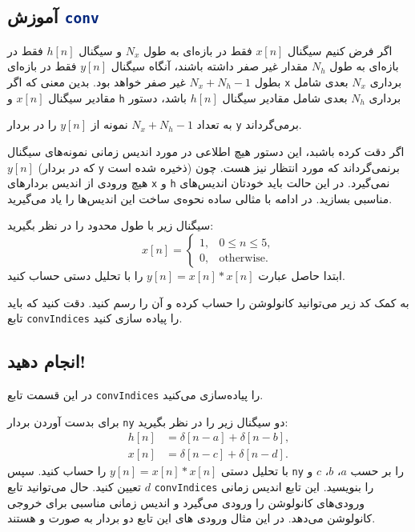 \documentclass{utsignal}
\begin{document}
	\subsection{آموزش \lstinline[language=Octave]{conv}}
	اگر فرض کنیم سیگنال $x[n]$ فقط در بازه‌ای به طول $N_x$ و سیگنال $h[n]$ فقط در بازه‌ای به طول $N_h$ مقدار غیر صفر داشته باشند، آنگاه سیگنال $y[n]$ فقط در بازه‌ای بطول $N_x+N_h-1$ غیر صفر خواهد بود. بدین معنی که اگر  \lstinline[language=Octave]{x} برداری $N_x$ بعدی شامل مقادیر سیگنال  $x[n]$ و \lstinline[language=Octave]{h} برداری $N_h$ بعدی شامل مقادیر سیگنال $h[n]$ باشد، دستور 
	\begin{latin}
		
	\end{latin}
	\noindent به تعداد $N_x+N_h-1$ نمونه از $y[n]$ را در بردار \lstinline[language=Octave]{y} برمی‌گرداند.
	
	اگر دقت کرده باشبد، این دستور هیچ اطلاعی در مورد اندیس زمانی نمونه‌های سیگنال $y[n]$ (که در بردار \lstinline[language=Octave]{y} ذخیره شده است) برنمی‌گرداند که مورد انتظار نیز هست. چون هیچ ورودی از اندیس بردارهای \lstinline[language=Octave]{x} و \lstinline[language=Octave]{h} نمی‌گیرد. در این حالت باید خودتان اندیس‌‌های مناسبی بسازید. در ادامه با مثالی ساده نحوه‌ی ساخت این اندیس‌ها را یاد می‌گیرید.
	
	سیگنال زیر با طول محدود را در نظر بگیرید:
	$$
	x[n]=\begin{cases}
		1, & 0 \le n \le 5,\\
		0, & \text{otherwise}.
	\end{cases}
	$$
	ابتدا حاصل عبارت $y[n]=x[n]*x[n]$ را با تحلیل دستی حساب کنید.
	
	به کمک کد زیر می‌توانید کانولوشن را حساب کرده و آن را رسم کنید. دقت کنید که باید تابع \lstinline[language=Octave]{convIndices} را پیاده سازی کنید.
	\begin{latin}
		
	\end{latin}
	
	\subsection{انجام دهید!}
	در این قسمت تابع \lstinline[language=Octave]{convIndices} را پیاده‌سازی می‌کنید.
	
	برای بدست آوردن بردار \lstinline[language=Octave]{ny} دو سیگنال زیر را در نظر بگیرید:
	\begin{align*}
	h[n] &= \delta[n - a] + \delta[n - b],\\
	x[n] &= \delta[n - c] + \delta[n - d].
	\end{align*}
	با تحلیل دستی $y[n]=x[n]*x[n]$ را حساب کنید. سپس \lstinline[language=Octave]{ny} را بر حسب $a$، $b$، $c$ و $d$ تعیین کنید. حال می‌توانید تابع  \lstinline[language=Octave]{convIndices} را بنویسید. این تابع اندیس زمانی ورودی‌های کانولوشن را ورودی می‌گیرد و اندیس زمانی مناسبی برای خروجی کانولوشن می‌دهد. در این مثال ورودی های این تابع دو بردار به صورت  و  هستند.
\end{document}
